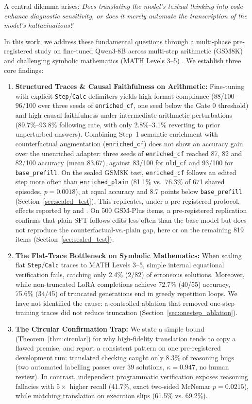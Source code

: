 \documentclass[11pt,a4paper]{article}
\begin{document}
A central dilemma arises: \textit{Does translating the model's textual thinking into code enhance diagnostic sensitivity, or does it merely automate the transcription of the model's hallucinations?}

In this work, we address these fundamental questions through a multi-phase pre-registered study on fine-tuned Qwen3-8B \citep{yang2024qwen2} across multi-step arithmetic (GSM8K) and challenging symbolic mathematics (MATH Levels 3--5) \citep{hendrycks2021measuring}. We establish three core findings:
\begin{enumerate}
    \item \textbf{Structured Traces \& Causal Faithfulness on Arithmetic:} Fine-tuning with explicit \texttt{Step}/\texttt{Calc} delimiters yields high format compliance (88/100--96/100 over three seeds of \texttt{enriched\_cf}, one seed below the Gate 0 threshold) and high causal faithfulness under intermediate arithmetic perturbations (89.7\%--93.8\% following rate, with only 2.8\%--3.1\% reverting to prior unperturbed answers). Combining Step~1 semantic enrichment with counterfactual augmentation (\texttt{enriched\_cf}) does not show an accuracy gain over the unenriched adapter: three seeds of \texttt{enriched\_cf} reached 87, 82 and 82/100 accuracy (mean 83.67), against 83/100 for \texttt{old\_cf} and 93/100 for \texttt{base\_prefill}. On the sealed GSM8K test, \texttt{enriched\_cf} follows an edited step more often than \texttt{enriched\_plain} (81.1\% vs.\ 76.3\% of 671 shared episodes, $p = 0.0018$), at equal accuracy and 8.7 points below \texttt{base\_prefill} (Section~\ref{sec:sealed_test}). This replicates, under a pre-registered protocol, effects reported by \citet{swaroop2025lift} and \citet{lobo2024impact}. On 500 GSM-Plus items, a pre-registered replication confirms that plain SFT follows edits less often than the base model but does not reproduce the counterfactual-vs.-plain gap, here or on the remaining 819 items (Section~\ref{sec:sealed_test}).
    \item \textbf{The Flat-Trace Bottleneck on Symbolic Mathematics:} When scaling flat \texttt{Step}/\texttt{Calc} traces to MATH Levels 3--5, simple internal equational verification fails, catching only 2.4\% (2/82) of erroneous solutions. Moreover, while non-truncated LoRA completions achieve 72.7\% (40/55) accuracy, 75.6\% (34/45) of truncated generations end in greedy repetition loops. We have not identified the cause: a controlled ablation that removed one-step training traces did not reduce truncation (Section~\ref{sec:onestep_ablation}).
    \item \textbf{The Circular Confirmation Trap:} We state a simple bound (Theorem~\ref{thm:circular}) for why high-fidelity translation tends to copy a flawed premise, and report a consistent pattern on one pre-registered development run: translated checking caught only 8.3\% of reasoning bugs (two automated labelling passes over 39 solutions, $\kappa = 0.947$, no human review). In contrast, independent programmatic verification exposes reasoning fallacies with $5\times$ higher recall (41.7\%, exact two-sided McNemar $p = 0.0215$), while matching translation on execution slips (61.5\% vs. 69.2\%).
\end{enumerate}
\end{document}
